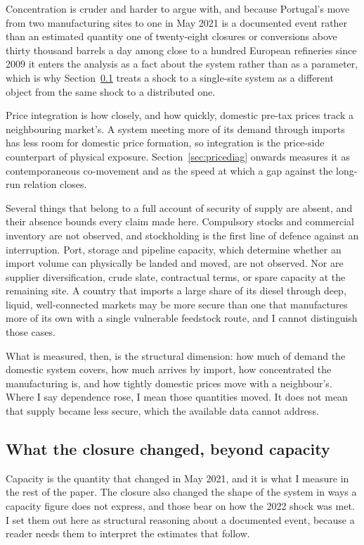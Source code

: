 \documentclass[11pt,a4paper]{article}
\begin{document}
Concentration is cruder and harder to argue with, and because Portugal's move from two
manufacturing sites to one in May 2021 is a documented event rather than an estimated quantity
\textemdash{} one of twenty-eight closures or conversions above thirty thousand barrels a day
among close to a hundred European refineries since 2009 \citep{concawe2025statistical}
\textemdash{} it enters the analysis as a fact about the system rather than as a parameter,
which is why Section~\ref{sec:closure} treats a shock to a single-site system as a different
object from the same shock to a distributed one.

Price integration is how closely, and how quickly, domestic pre-tax prices track a
neighbouring market's. A system meeting more of its demand through imports has less room for
domestic price formation, so integration is the price-side counterpart of physical exposure.
Section~\ref{sec:pricediag} onwards measures it as contemporaneous co-movement and as the speed
at which a gap against the long-run relation closes.

Several things that belong to a full account of security of supply are absent, and their absence
bounds every claim made here. Compulsory stocks and commercial inventory are not observed, and
stockholding is the first line of defence against an interruption. Port, storage and pipeline
capacity, which determine whether an import volume can physically be landed and moved, are not
observed. Nor are supplier diversification, crude slate, contractual terms, or spare capacity at
the remaining site. A country that imports a large share of its diesel through deep, liquid,
well-connected markets may be more secure than one that manufactures more of its own with a
single vulnerable feedstock route, and I cannot distinguish those cases.

What is measured, then, is the structural dimension: how much of demand the domestic system
covers, how much arrives by import, how concentrated the manufacturing is, and how tightly
domestic prices move with a neighbour's. Where I say dependence rose, I mean those quantities
moved. It does not mean that supply became less secure, which the available data cannot address.

\subsection{What the closure changed, beyond capacity}
\label{sec:closure}

Capacity is the quantity that changed in May 2021, and it is what I measure in the rest of the
paper. The closure also changed the shape of the system in ways a capacity figure does not
express, and those bear on how the 2022 shock was met. I set them out here as structural
reasoning about a documented event, because a reader needs them to interpret the estimates that
follow.
\end{document}

